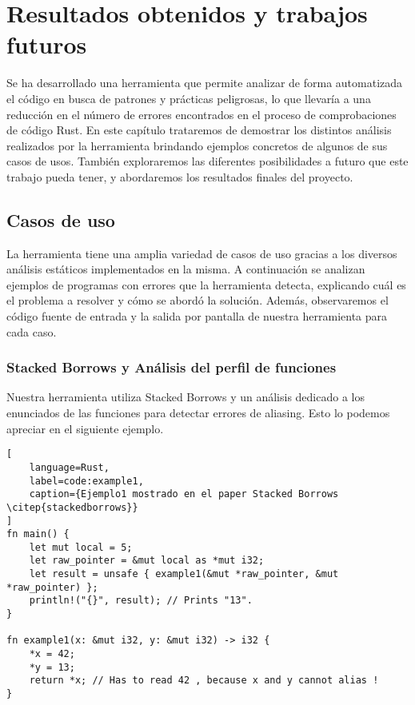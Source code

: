 \chapter{Resultados obtenidos y trabajos futuros}

Se ha desarrollado una herramienta que permite analizar de forma automatizada el código en busca de patrones y prácticas peligrosas, lo que llevaría a una reducción en el número de errores encontrados en el proceso de comprobaciones de código Rust. En este capítulo trataremos de demostrar los distintos análisis realizados por la herramienta brindando ejemplos concretos de algunos de sus casos de usos. También exploraremos las diferentes posibilidades a futuro que este trabajo pueda tener, y abordaremos los resultados finales del proyecto. 

\section{Casos de uso}

La herramienta tiene una amplia variedad de casos de uso gracias a los diversos análisis estáticos implementados en la misma. A continuación se analizan ejemplos de programas con errores que la herramienta detecta, explicando cuál es el problema a resolver y cómo se abordó la solución. Además, observaremos el código fuente de entrada y la salida por pantalla de nuestra herramienta para cada caso.

\subsection{Stacked Borrows y Análisis del perfil de funciones}
Nuestra herramienta utiliza Stacked Borrows y un análisis dedicado a los enunciados de las funciones para detectar errores de aliasing. Esto lo podemos apreciar en el siguiente ejemplo.

\begin{lstlisting}[
    language=Rust,
    label=code:example1,
    caption={Ejemplo1 mostrado en el paper Stacked Borrows \citep{stackedborrows}}
]
fn main() {
    let mut local = 5;
    let raw_pointer = &mut local as *mut i32;
    let result = unsafe { example1(&mut *raw_pointer, &mut *raw_pointer) };
    println!("{}", result); // Prints "13".
}

fn example1(x: &mut i32, y: &mut i32) -> i32 {
    *x = 42;
    *y = 13;
    return *x; // Has to read 42 , because x and y cannot alias !
}
\end{lstlisting}

